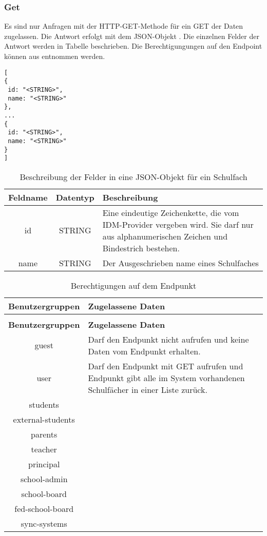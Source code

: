 \subsubsection{Get}
\label{sec:end:rest:api:school-subjects:get}
Es sind nur Anfragen mit der HTTP-GET-Methode für ein GET der Daten zugelassen.
Die Antwort erfolgt mit dem JSON-Objekt . Die einzelnen Felder der Antwort werden in Tabelle  beschrieben.
Die Berechtigungungen auf den Endpoint können aus  entnommen werden.

\begin{lstlisting}[caption={JSON-Antwort für einen GET-Aufruf der Route /api/school-subjects},label={lst:code:end:rest:api:school-subjects:get:ret},frame=tlrb]
[
{
 id: "<STRING>",
 name: "<STRING>"
},
...
{
 id: "<STRING>",
 name: "<STRING>"
}
]
\end{lstlisting}
\begin{table}[!htb]
	\begin{tabularx}{\textwidth}{|c|c|X|}
		\hline
			\textbf{Feldname} & \textbf{Datentyp} & \textbf{Beschreibung} \\ \hline
			id & STRING & Eine eindeutige Zeichenkette, die vom IDM-Provider vergeben wird. Sie darf nur aus alphanumerischen Zeichen und Bindestrich bestehen.\\ \hline
			name & STRING & Der Ausgeschrieben name eines Schulfaches \\ \hline
	\end{tabularx}

		\caption{Beschreibung der Felder in eine JSON-Objekt für ein Schulfach}
		\label{tab:end:rest:api:school-subjects:get:ret:json}
\end{table}
\begin{longtable}{|c|p{}|}
		\caption{Berechtigungen auf dem Endpunkt}
		\label{tab:end:rest:api:school-subjects:get:right} \\
\hline
\textbf{Benutzergruppen} & \textbf{Zugelassene Daten} \\ \hline
\endfirsthead
		\caption{Berechtigungen auf dem Endpunkt}\\
\hline
\textbf{Benutzergruppen} & \textbf{Zugelassene Daten} \\ \hline
\endhead
guest & Darf den Endpunkt nicht aufrufen und keine Daten vom Endpunkt erhalten. \\ \hline
user & Darf den Endpunkt mit GET aufrufen und Endpunkt gibt alle im System vorhandenen Schulfächer in einer Liste zurück. \\ \hline
students &  \\ \hline
external-students &  \\ \hline
parents &  \\ \hline
teacher &  \\ \hline
principal &  \\ \hline
school-admin &  \\ \hline
school-board &  \\ \hline
fed-school-board &  \\ \hline
sync-systems &  \\ \hline
	\end{longtable}